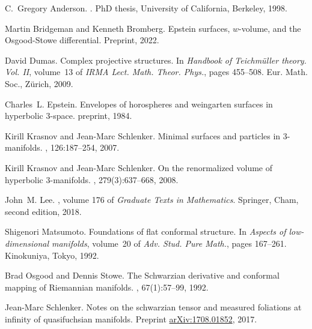\documentclass{amsart}
\numberwithin{equation}{section}
\begin{document}
\begin{thebibliography}{Dum09}

C.~Gregory Anderson.
.
\newblock PhD thesis, University of California, Berkeley, 1998.

Martin Bridgeman and Kenneth Bromberg.
\newblock Epstein surfaces, $w$-volume, and the {O}sgood-{S}towe differential.
\newblock Preprint, 2022.

David Dumas.
\newblock Complex projective structures.
\newblock In {\em Handbook of {T}eichm{\"u}ller theory. {V}ol. {II}}, volume~13
  of {\em IRMA Lect. Math. Theor. Phys.}, pages 455--508. Eur. Math. Soc.,
  Z{\"u}rich, 2009.

Charles~L. Epstein.
\newblock Envelopes of horospheres and weingarten surfaces in hyperbolic
  3-space.
\newblock preprint, 1984.

Kirill Krasnov and Jean-Marc Schlenker.
\newblock Minimal surfaces and particles in 3-manifolds.
, 126:187--254, 2007.

Kirill Krasnov and Jean-Marc Schlenker.
\newblock On the renormalized volume of hyperbolic 3-manifolds.
, 279(3):637--668, 2008.

John~M. Lee.
, volume 176 of {\em
  Graduate Texts in Mathematics}.
\newblock Springer, Cham, second edition, 2018.

Shigenori Matsumoto.
\newblock Foundations of flat conformal structure.
\newblock In {\em Aspects of low-dimensional manifolds}, volume~20 of {\em Adv.
  Stud. Pure Math.}, pages 167--261. Kinokuniya, Tokyo, 1992.

Brad Osgood and Dennis Stowe.
\newblock The {S}chwarzian derivative and conformal mapping of {R}iemannian
  manifolds.
, 67(1):57--99, 1992.

Jean-Marc Schlenker.
\newblock Notes on the schwarzian tensor and measured foliations at infinity of
  quasifuchsian manifolds.
\newblock Preprint \href{https://arxiv.org/abs/1708.01852}{arXiv:1708.01852},
  2017.

\end{thebibliography}



 
\end{document}
